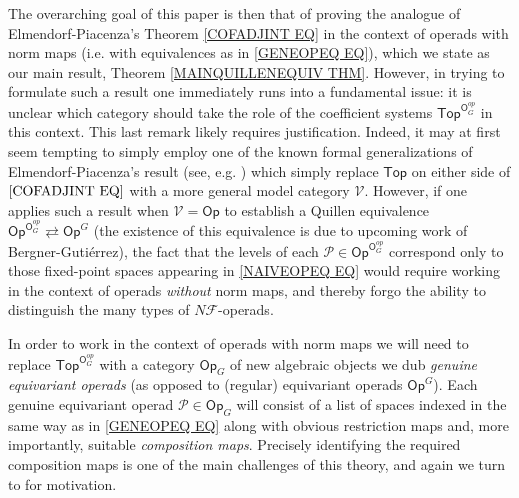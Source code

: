 \documentclass[a4paper,10pt
,draft
]{article}%
\numberwithin{equation}{section}
\numberwithin{figure}{section}
\theoremstyle{definition} %
\newcommand{\Op}{\mathsf{Op}}%
\newcommand{\1}{\ensuremath{\mathbbm 1}}%
\begin{document}
The overarching goal of this paper is then that of proving the analogue of Elmendorf-Piacenza's Theorem \eqref{COFADJINT EQ}
in the context of operads with norm maps (i.e. with equivalences as in \eqref{GENEOPEQ EQ}),
which we state as our main result, Theorem \ref{MAINQUILLENEQUIV THM}.
However, in trying to formulate such a result one immediately runs into a fundamental issue: 
it is unclear which category should take the role of the coefficient systems $\mathsf{Top}^{\mathsf{O}_G^{op}}$ in this context.
This last remark likely requires justification. 
Indeed, it may at first seem tempting to simply 
employ one of the known formal generalizations of Elmendorf-Piacenza's result (see, e.g. \cite[Thm. 3.17]{Ste16}) which simply replace
$\mathsf{Top}$ on either side of $\eqref{COFADJINT EQ}$
with a more general model category $\mathcal{V}$.
However, if one applies such a result when 
$\mathcal{V}=\mathsf{Op}$
to establish a Quillen equivalence
$\mathsf{Op}^{\mathsf{O}_G^{op}}
\rightleftarrows
\mathsf{Op}^G$
(the existence of this equivalence is due to
upcoming work of Bergner-Guti\'{e}rrez), 
the fact that 
the levels of each 
$\mathcal{P} \in \mathsf{Op}^{\mathsf{O}_G^{op}}$
correspond only to those fixed-point spaces appearing in \eqref{NAIVEOPEQ EQ}
would require working in the context of operads \textit{without} norm maps,
and thereby forgo the ability to distinguish 
the many types of $N \mathcal{F}$-operads.


In order to work in the context of operads with norm maps we will need to replace 
$\mathsf{Top}^{\mathsf{O}_G^{op}}$
with a category
$\mathsf{Op}_G$
\index{categories!OpG@$\mathcal P \in \Op_G$}
of new algebraic objects we dub 
\textit{genuine equivariant operads}
(as opposed to (regular) equivariant operads
$\mathsf{Op}^G$).
Each genuine equivariant operad 
$\mathcal{P} \in \mathsf{Op}_G$
will consist of a list of spaces indexed
in the same way as in 
\eqref{GENEOPEQ EQ} along with obvious restriction maps and, more importantly, 
suitable \textit{composition maps}. Precisely identifying the required composition maps is one of the main challenges of this theory, and again we turn to \cite{BH15} for motivation.
\end{document}
